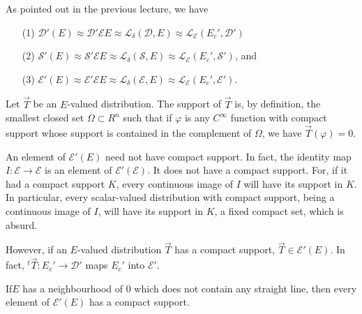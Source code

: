 As pointed out in the previous lecture, we have

\begin{itemize}
\item [(1)] $\mathscr{D}' (E) \approx \mathscr{D}' \mathcal{E} E \approx
  \mathscr{L}_\delta (\mathscr{D}, E) \approx \mathscr{L}_\mathcal{E}
  (E_c', \mathscr{D}')$
\item [(2)] $\mathscr{S}'(E) \approx \mathscr{S}' \mathcal{E} E
  \approx \mathscr{L}_\delta (\mathscr{S}, E) \approx
  \mathscr{L}_\mathcal{E} (E_c', \mathscr{S}')$, and 
\item [(3)] $\mathscr{E}' (E) \approx \mathscr{E}' \mathcal{E} E
  \approx \mathscr{L}_\delta (\mathscr{E}, E) \approx
  \mathscr{L}_\mathcal{E} (E_c', \mathscr{E}')$.
\end{itemize}

\begin{definition}\label{chap5:def5.2}
Let $\overrightarrow{T}$ be an $E$-valued distribution. The support of
$\overrightarrow{T}$ is, by definition, the smallest closed set
$\Omega\subset R^n$ such that if $\varphi$ is any $C^\infty$ function
with compact support whose support is contained in the complement of
$\Omega$, we have $\overrightarrow{T}(\varphi)=0$. 
\end{definition}

\begin{remark*}
An element of $\mathscr{E}' (E)$ need not have compact support. In
fact, the identity map $I : \mathscr{E} \to \mathscr{E}$ is an element
of $\mathscr{E}' (\mathscr{E})$. It does not have a compact
support. For, if it had a compact support $K$, every continuous image
of $I$ will have its support in $K$. In particular, every
scalar-valued distribution with compact support, being a continuous
image of $I$, will have its support in $K$, a fixed compact set, which
is absurd.

However, if an $E$-valued distribution $\overrightarrow{T}$ has a
compact support, $\overrightarrow{T} \in \mathscr{E}' (E)$. In fact,
${}^t \overrightarrow{T} : E_c' \to \mathscr{D}'$ maps $E_c'$ into 
 $\mathscr{E}'$.
\end{remark*}

\setcounter{prop}{2}
\begin{prop}\label{chap5:prop5.3}
If\pageoriginale $E$ has a neighbourhood of $0$ which does not contain
any straight line, then every element of $\mathscr{E}' (E)$ has a
compact support.
\end{prop}

